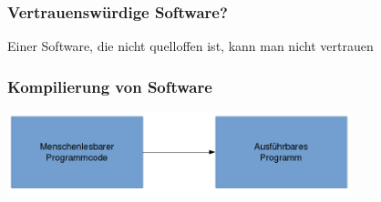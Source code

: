 \documentclass[12pt, xcolor={svgnames,table}]{beamer}
\begin{document}
\begin{frame}
    \frametitle{Vertrauenswürdige Software?}
    \begin{center}\Large
        Einer Software, die nicht quelloffen ist, kann man nicht vertrauen
    \end{center}
\end{frame}

\begin{frame}
  \frametitle{Kompilierung von Software}
  \begin{center}
    \includegraphics[width=10cm]{img/compilation-process}
  \par\end{center}
\end{frame}
\end{document}
